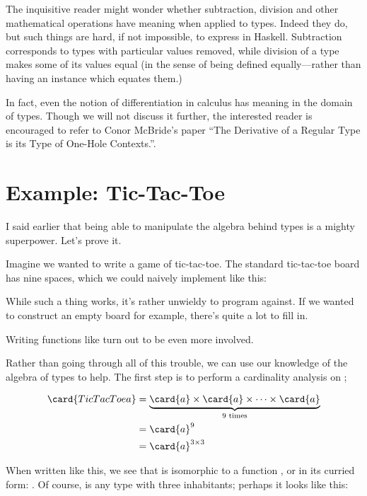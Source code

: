 \documentclass[book.tex]{subfiles}
\begin{document}
The inquisitive reader might wonder whether subtraction, division and other
mathematical operations have meaning when applied to types. Indeed they do, but
such things are hard, if not impossible, to express in Haskell. Subtraction
corresponds to types with particular values removed, while division of a type
makes some of its values equal (in the sense of being defined equally---rather
than having an  instance which equates them.)

In fact, even the notion of differentiation in calculus has meaning in the
domain of types. Though we will not discuss it further, the interested reader is
encouraged to refer to Conor McBride's paper ``The Derivative of a Regular Type
is its Type of One-Hole Contexts.''\cite{one-hole}.


\section{Example: Tic-Tac-Toe}

I said earlier that being able to manipulate the algebra behind types is a
mighty superpower. Let's prove it.

Imagine we wanted to write a game of tic-tac-toe. The standard tic-tac-toe board
has nine spaces, which we could naively implement like this:


While such a thing works, it's rather unwieldy to program against. If we wanted
to construct an empty board for example, there's quite a lot to fill in.


Writing functions like  turn out to be even more involved.

Rather than going through all of this trouble, we can use our knowledge of the
algebra of types to help. The first step is to perform a cardinality analysis on
;

$$
\begin{align*}
  \card{TicTacToe a} &= \underbrace{\card{a} \times \card{a} \times \cdots
  \times \card{a}}_{9 \text{ times}} \\
    &= \card{a}^{9} \\
    &= \card{a}^{3\times 3}
\end{align*}
$$

When written like this, we see that  is isomorphic to a function
, or in its curried form: . Of
course,  is any type with three inhabitants; perhaps it looks like
this:
\end{document}
